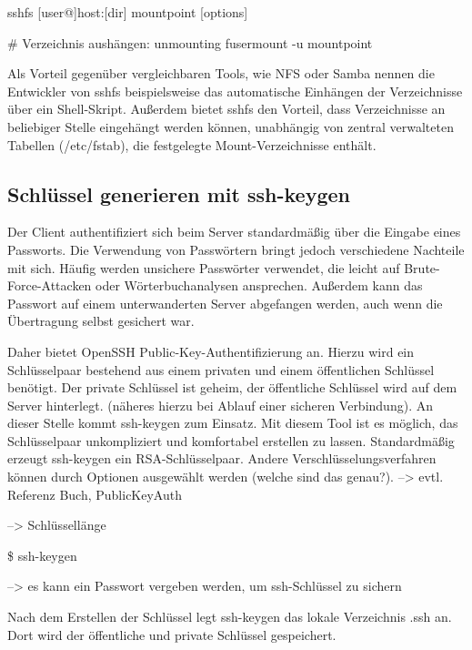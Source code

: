\documentclass[ngerman,pdf]{wkcms}    %
\begin{document}
\begin{program}
sshfs [user@]host:[dir] mountpoint [options]

# Verzeichnis aushängen:
unmounting fusermount -u mountpoint
\end{program}

Als Vorteil gegenüber vergleichbaren Tools, wie NFS oder Samba nennen die Entwickler von \IT sshfs beispielsweise das automatische Einhängen der Verzeichnisse über ein Shell-Skript. Außerdem bietet \IT sshfs den Vorteil, dass Verzeichnisse an beliebiger Stelle eingehängt werden können, unabhängig von zentral verwalteten Tabellen (/etc/fstab), die festgelegte Mount-Verzeichnisse enthält. \cite{sshfs}

\subsection{Schlüssel generieren mit \IT ssh-\IT keygen}

Der Client authentifiziert sich beim Server standardmäßig über die Eingabe eines Passworts. Die Verwendung von Passwörtern bringt jedoch verschiedene Nachteile mit sich. Häufig werden unsichere Passwörter verwendet, die leicht auf Brute-Force-Attacken oder Wörterbuchanalysen ansprechen.\cite{schneier} Außerdem kann das Passwort auf einem unterwanderten Server abgefangen werden, auch wenn die Übertragung selbst gesichert war. \cite[S. 29]{SSH}

Daher bietet OpenSSH \IT Public-Key-Authentifizierung an. Hierzu wird ein Schlüsselpaar bestehend aus einem privaten und einem öffentlichen Schlüssel benötigt. Der private Schlüssel ist geheim, der öffentliche Schlüssel wird auf dem Server hinterlegt. \cite[S. 114]{openssh_book} (näheres hierzu bei Ablauf einer sicheren Verbindung). An dieser Stelle kommt \IT ssh-keygen zum Einsatz. Mit diesem Tool ist es möglich, das Schlüsselpaar unkompliziert und komfortabel erstellen zu lassen. Standardmäßig erzeugt \IT ssh-keygen ein RSA-Schlüsselpaar. Andere Verschlüsselungsverfahren können durch Optionen ausgewählt werden (welche sind das genau?). --> evtl. Referenz Buch, PublicKeyAuth

--> Schlüssellänge

\begin{program}
\$ ssh-keygen
\end{program}

--> es kann ein Passwort vergeben werden, um ssh-Schlüssel zu sichern


Nach dem Erstellen der Schlüssel legt \IT ssh-keygen das lokale Verzeichnis \IT .ssh an. Dort wird der öffentliche und private Schlüssel gespeichert.
\end{document}
